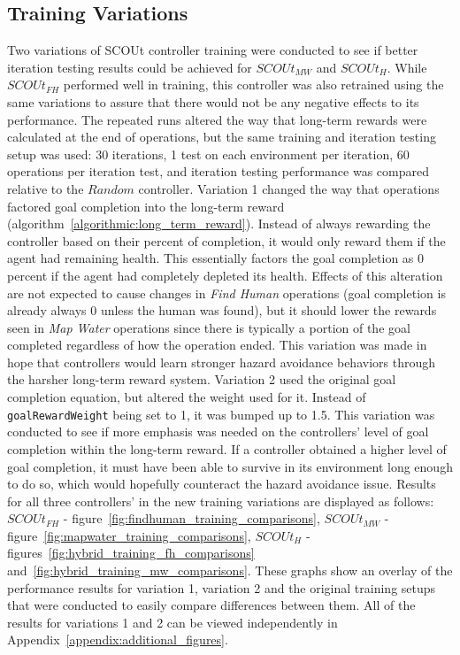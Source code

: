 \subsection{Training Variations} \label{subsec:training_variations}
Two variations of SCOUt controller training were conducted to see if better iteration testing results could be achieved for $SCOUt_{MW}$ and $SCOUt_{H}$.
While $SCOUt_{FH}$ performed well in training, this controller was also retrained using the same variations to assure that there would not be any negative effects to its performance.
The repeated runs altered the way that long-term rewards were calculated at the end of operations, but the same training and iteration testing setup was used: 30 iterations, 1 test on each environment per iteration, 60 operations per iteration test, and iteration testing performance was compared relative to the $Random$ controller.
Variation 1 changed the way that operations factored goal completion into the long-term reward (algorithm~\ref{algorithmic:long_term_reward}).
Instead of always rewarding the controller based on their percent of completion, it would only reward them if the agent had remaining health.
This essentially factors the goal completion as 0 percent if the agent had completely depleted its health.
Effects of this alteration are not expected to cause changes in \textit{Find Human} operations (goal completion is already always 0 unless the human was found), but it should lower the rewards seen in \textit{Map Water} operations since there is typically a portion of the goal completed regardless of how the operation ended.
This variation was made in hope that controllers would learn stronger hazard avoidance behaviors through the harsher long-term reward system.
Variation 2 used the original goal completion equation, but altered the weight used for it.
Instead of \texttt{goalRewardWeight} being set to 1, it was bumped up to 1.5.
This variation was conducted to see if more emphasis was needed on the controllers' level of goal completion within the long-term reward.
If a controller obtained a higher level of goal completion, it must have been able to survive in its environment long enough to do so, which would hopefully counteract the hazard avoidance issue.
Results for all three controllers' in the new training variations are displayed as follows: $SCOUt_{FH}$ - figure~\ref{fig:findhuman_training_comparisons}, $SCOUt_{MW}$ - figure~\ref{fig:mapwater_training_comparisons}, $SCOUt_{H}$ - figures~\ref{fig:hybrid_training_fh_comparisons} and~\ref{fig:hybrid_training_mw_comparisons}.
These graphs show an overlay of the performance results for variation 1, variation 2 and the original training setups that were conducted to easily compare differences between them.
All of the results for variations 1 and 2 can be viewed independently in Appendix~\ref{appendix:additional_figures}.

